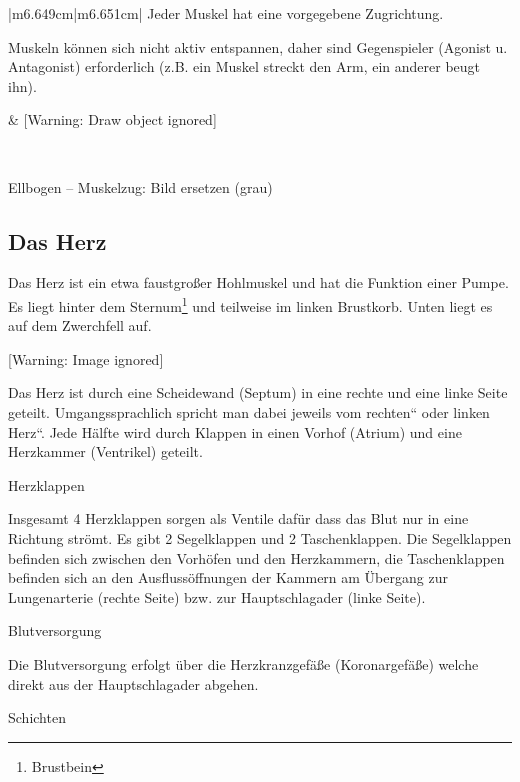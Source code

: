 \documentclass{article}
\begin{document}
\begin{center}
\tablehead{}\begin{supertabular}{|m{6.649cm}|m{6.651cm}|}
\hline
Jeder Muskel hat eine vorgegebene  Zugrichtung. 

Muskeln k\"onnen sich nicht aktiv  entspannen, daher sind Gegenspieler 
(Agonist u. Antagonist) erforderlich (z.B. ein Muskel streckt den Arm,
ein anderer beugt ihn).

 &
%
%
[Warning: Draw object ignored]

\\\hline
\end{supertabular}
\end{center}
Ellbogen -- Muskelzug: Bild ersetzen (grau)

\subsection{Das Herz}
Das Herz ist ein etwa faustgro{\ss}er Hohlmuskel und hat die Funktion
einer Pumpe. Es liegt hinter dem Sternum\footnote{Brustbein} und
teilweise im linken Brustkorb. Unten liegt es auf dem Zwerchfell auf. 

\begin{center}
 [Warning: Image ignored] %

\end{center}
Das Herz ist durch eine Scheidewand (Septum) in eine rechte und eine
linke Seite geteilt. Umgangssprachlich spricht man dabei jeweils vom
{\quotedblbase}rechten{\textquotedblleft} oder {\quotedblbase}linken
Herz{\textquotedblleft}. Jede H\"alfte wird durch Klappen in einen
Vorhof (Atrium) und eine Herzkammer (Ventrikel) geteilt. 

Herzklappen

Insgesamt 4 Herzklappen sorgen als Ventile daf\"ur dass das Blut nur in
eine Richtung str\"omt. Es gibt 2 Segelklappen und 2 Taschenklappen.
Die Segelklappen befinden sich zwischen den Vorh\"ofen und den
Herzkammern, die Taschenklappen befinden sich an den
Ausfluss\"offnungen der Kammern am \"Ubergang zur Lungenarterie (rechte
Seite) bzw. zur Hauptschlagader (linke Seite). 

Blutversorgung

Die Blutversorgung erfolgt \"uber die Herzkranzgef\"a{\ss}e
(Koronargef\"a{\ss}e) welche direkt aus der Hauptschlagader abgehen. 

Schichten
\end{document}

